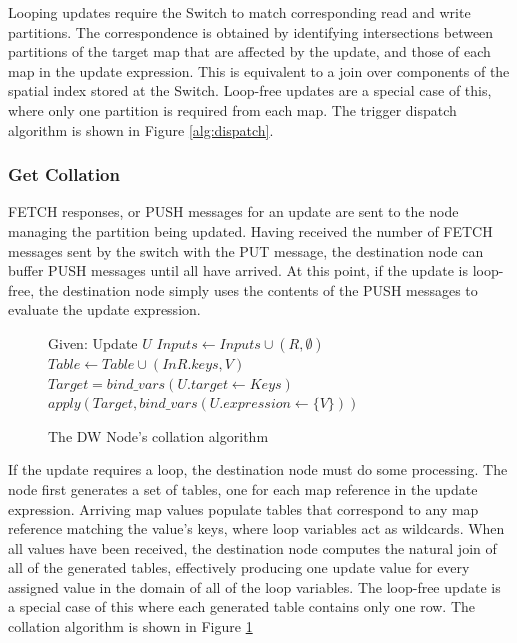 \documentclass{sig-alternate}
\begin{document}
Looping updates require the Switch to match corresponding read and write partitions.  The correspondence is obtained by identifying intersections between partitions of the target map that are affected by the update, and those of each map in the update expression.  This is equivalent to a join over components of the spatial index stored at the Switch.  Loop-free updates are a special case of this, where only one partition is required from each map.  The trigger dispatch algorithm is shown in Figure \ref{alg:dispatch}.

\subsubsection{Get Collation}

FETCH responses, or PUSH messages for an update are sent to the node managing the partition being updated.  Having received the number of FETCH messages sent by the switch with the PUT message, the destination node can buffer PUSH messages until all have arrived.  At this point, if the update is loop-free, the destination node simply uses the contents of the PUSH messages to evaluate the update expression.

\begin{figure}
\begin{algorithmic}[1]
\STATE Given: Update $U$
	\STATE $Inputs \leftarrow Inputs \cup (R, \emptyset)$
\ENDFOR
{}
			\STATE $Table \leftarrow Table \cup (InR.keys, V)$
		\ENDIF
	\ENDFOR
\ENDFOR
{}
	\STATE $Target = bind\_vars(U.target \leftarrow Keys)$
	\STATE $apply(Target, bind\_vars(U.expression \leftarrow \{V\}))$
\ENDFOR
\end{algorithmic}
\caption{The DW Node's collation algorithm}
\label{alg:collation}
\end{figure}

If the update requires a loop, the destination node must do some processing.  The node first generates a set of tables, one for each map reference in the update expression.  Arriving map values populate tables that correspond to any map reference matching the value's keys, where loop variables act as wildcards.  When all values have been received, the destination node computes the natural join of all of the generated tables, effectively producing one update value for every assigned value in the domain of all of the loop variables.  The loop-free update is a special case of this where each generated table contains only one row.  The collation algorithm is shown in Figure \ref{alg:collation}
\end{document}
